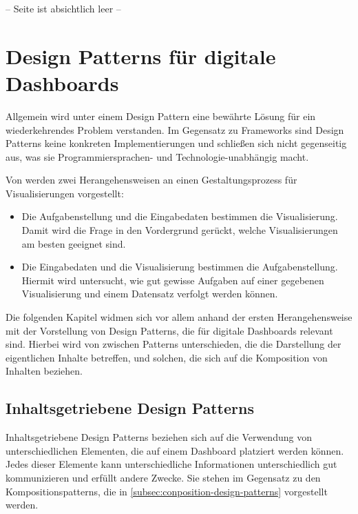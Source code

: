 \newpage
-- Seite ist absichtlich leer --
\newpage


\section{Design Patterns für digitale Dashboards}\label{sec:design-patterns-list}

Allgemein wird unter einem Design Pattern eine bewährte Lösung für ein wiederkehrendes Problem verstanden.
Im Gegensatz zu Frameworks sind Design Patterns keine konkreten Implementierungen und schließen sich nicht gegenseitig aus, was sie Programmiersprachen- und Technologie-unabhängig macht.

Von \autocite[S. 2367]{Schulz.DesignSpaceVisualizationTasks.2013} werden zwei Herangehensweisen an einen Gestaltungsprozess für Visualisierungen vorgestellt:

\begin{itemize}
    \item Die Aufgabenstellung und die Eingabedaten bestimmen die Visualisierung.
    Damit wird die Frage in den Vordergrund gerückt, welche Visualisierungen am besten geeignet sind.
    \item Die Eingabedaten und die Visualisierung bestimmen die Aufgabenstellung.
    Hiermit wird untersucht, wie gut gewisse Aufgaben auf einer gegebenen Visualisierung und einem Datensatz verfolgt werden können.
\end{itemize}

Die folgenden Kapitel widmen sich vor allem anhand der ersten Herangehensweise mit der Vorstellung von Design Patterns, die für digitale Dashboards relevant sind.
Hierbei wird von \autocite[S. 3--5]{Bach.DashboardDesignPatterns.2023} zwischen Patterns unterschieden, die die Darstellung der eigentlichen Inhalte betreffen, und solchen, die sich auf die Komposition von Inhalten beziehen.

\subsection{Inhaltsgetriebene Design Patterns}\label{subsec:content-design-patterns}

Inhaltsgetriebene Design Patterns beziehen sich auf die Verwendung von unterschiedlichen Elementen, die auf einem Dashboard platziert werden können.
Jedes dieser Elemente kann unterschiedliche Informationen unterschiedlich gut kommunizieren und erfüllt andere Zwecke.
Sie stehen im Gegensatz zu den Kompositionspatterns, die in \autoref{subsec:conposition-design-patterns} vorgestellt werden.

